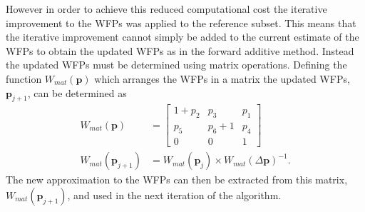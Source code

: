 \documentclass[12pt,oneside,openany,a4paper, %
english, %
masters-t, goldenblock]{usthesis}
\newcommand*\mean[1]{\bar{#1}} %
\begin{document}




However in order to achieve this reduced computational cost the iterative improvement to the WFPs was applied to the reference subset. This means that the iterative improvement cannot simply be added to the current estimate of the WFPs to obtain the updated WFPs as in the forward additive method. Instead the updated WFPs must be determined using matrix operations. Defining the function $W_{mat}(\bm{p})$ which arranges the WFPs in a matrix the updated WFPs, $\bm{p}_{j+1}$, can be determined as 
\begin{align}
  W_{mat}(\bm{p})&= 
  \begin{bmatrix}
    1+ p_2 & p_3 & p_1 \\
    p_5 & p_6 +1 & p_4 \\
    0 & 0 & 1
  \end{bmatrix} \\
  W_{mat}(\bm{p}_{j+1}) &= W_{mat}(\bm{p}_{j}) \times W_{mat}(\Delta \bm{p})^{-1}. \label{eq: inv comp update}
\end{align}
The new approximation to the WFPs can then be extracted from this matrix, $W_{mat}(\bm{p}_{j+1})$, and used in the next iteration of the algorithm.
\end{document}
